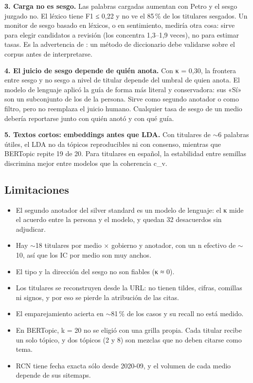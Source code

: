 \documentclass[10pt,twocolumn]{article}
\begin{document}
\textbf{3. Carga no es sesgo.} Las palabras cargadas aumentan con Petro y el sesgo
juzgado no. El léxico tiene F1 ≤ 0,22 y no ve el 85\,\% de los titulares
sesgados. Un monitor de sesgo basado en léxicos, o en sentimiento, mediría otra
cosa: sirve para elegir candidatos a revisión (los concentra 1,3--1,9 veces),
no para estimar tasas. Es la advertencia de \cite{grimmer2013}: un método de
diccionario debe validarse sobre el corpus antes de interpretarse.

\textbf{4. El juicio de sesgo depende de quién anota.} Con κ = 0,30, la frontera
entre sesgo y no sesgo a nivel de titular depende del umbral de quien anota. El
modelo de lenguaje aplicó la guía de forma más literal y conservadora: sus «Sí»
son un subconjunto de los de la persona. Sirve como segundo anotador o como
filtro, pero no reemplaza el juicio humano. Cualquier tasa de sesgo de un medio
debería reportarse junto con quién anotó y con qué guía.

\textbf{5. Textos cortos: embeddings antes que LDA.} Con titulares de $\sim$6
palabras útiles, el LDA no da tópicos reproducibles ni con consenso, mientras que
BERTopic repite 19 de 20. Para titulares en español, la estabilidad entre
semillas discrimina mejor entre modelos que la coherencia c\_v.

\subsection{Limitaciones}
\begin{itemize}
\item El segundo anotador del silver standard es un modelo de lenguaje: el κ mide
el acuerdo entre la persona y el modelo, y quedan 32 desacuerdos sin adjudicar.
\item Hay $\sim$18 titulares por medio × gobierno y anotador, con un n efectivo
de $\sim$10, así que los IC por medio son muy anchos.
\item El tipo y la dirección del sesgo no son fiables (κ ≈ 0).
\item Los titulares se reconstruyen desde la URL: no tienen tildes, cifras,
comillas ni signos, y por eso se pierde la atribución de las citas.
\item El emparejamiento acierta en $\sim$81\,\% de los casos y su recall no está
medido.
\item En BERTopic, k = 20 no se eligió con una grilla propia. Cada titular recibe
un solo tópico, y dos tópicos (2 y 8) son mezclas que no deben citarse como tema.
\item RCN tiene fecha exacta sólo desde 2020-09, y el volumen de cada medio
depende de sus sitemaps.
\end{itemize}
\end{document}
